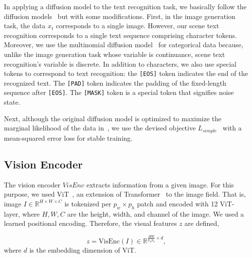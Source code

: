 \documentclass{article}
\begin{document}
In applying a diffusion model to the text recognition task, we basically follow the diffusion models~\cite{sohl2015diffusionmodel, Hoogeboom2021argmax} but with some modifications.
First, in the image generation task, the data $x_{t}$ corresponds to a single image. 
However, our scene text recognition corresponds to a single text sequence comprising character tokens.
Moreover, we use the multinomial diffusion model~\cite{Hoogeboom2021argmax} for categorical data because, unlike the image generation task whose variable is continuance, scene text recognition's variable is discrete.
In addition to characters, we also use special tokens to correspond to text recognition: the \texttt{[EOS]} token indicates the end of the recognized text. 
The \texttt{[PAD]} token indicates the padding of the fixed-length sequence after \texttt{[EOS]}.
The \texttt{[MASK]} token is a special token that signifies noise state.

Next, although the original diffusion model is optimized to maximize the marginal likelihood of the data in~\cite{sohl2015diffusionmodel}, we use the devised objective $L_{simple}$~\cite{ho2020ddpm} with a mean-squared error loss for stable training.


\subsection{Vision Encoder}
The vision encoder $VisEnc$ extracts information from a given image.
For this purpose, we used ViT~\cite{dosovitskiy2020vit}, an extension of Transformer~\cite{vaswani2017transformer} to the image field.
That is, image $I \in \mathbb{R}^{H\times W \times C}$ is tokenized per $p_{w} \times p_{h}$ patch and encoded with 12 ViT-layer, where $H, W, C$ are the height, width, and channel of the image.
We used a learned positional encoding.
Therefore, the visual features $z$ are defined, 

\begin{equation}\label{Eq:vision_encoder}
   z = \mathrm{VisEnc}(I) \in {\mathbb{R}^{{{ \frac{HW}{p_{w}p_{h}} \times d}}}},
\end{equation}
where $d$ is the embedding dimension of ViT.
\end{document}
